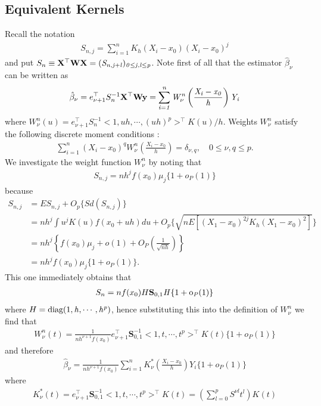 \documentclass[12pt]{article}
\renewcommand{\=}[1]{\stackrel{#1}{=}} %
\theoremstyle{definition}
\begin{document}
\subsection{Equivalent Kernels}
	Recall the notation
	\begin{align}
	S_{n,j}=\sum_{i=1}^nK_h(X_i-x_0)(X_i-x_0)^j
	\end{align}
	and put $S_n\equiv\bf X^{\top}WX=\it(S_{n,j+l})_{0\leq j,l\leq p}$. Note first of all that the estimator $\hat{\beta}_{\nu}$ can be written as
	\begin{align}
	\hat{\beta}_{\nu}=e_{\nu+1}^{\top}S_n^{-1}\bf X^{\top}Wy=\it\sum_{i=1}^nW_{\nu}^n\left(\frac{X_i-x_0}{h}\right)Y_i
	\end{align}
	where $W_{\nu}^n(u)=e_{\nu+1}^{\top}S_n^{-1}<1,uh,\cdots,(uh)^p>^{\top}K(u)/h$. Weights $W_{\nu}^n$ satisfy the following discrete moment conditions :
	\begin{align}
	\sum_{i=1}^n(X_i-x_0)^qW_{\nu}^n\left(\frac{X_i-x_0}{h}\right)=\delta_{\nu,q},\quad0\leq\nu,q\leq p.
	\end{align}
	We investigate the weight function $W_{\nu}^n$ by noting that
	\begin{align}
	S_{n,j}=nh^jf(x_0)\mu_j\{1+o_P(1)\}
	\end{align}
	because
	\begin{align}
	\nonumber S_{n,j}&=ES_{n,j}+O_p\{Sd(S_{n,j})\}\\
	\nonumber&=nh^j\int u^jK(u)f(x_0+uh)du+O_p\{\sqrt{nE[(X_1-x_0)^{2j}K_h(X_1-x_0)^2]}\}\\
	\nonumber&=nh^j\left\{f(x_0)\mu_j+o(1)+O_P\left(\frac{1}{\sqrt{nh}}\right)\right\}\\
	&=nh^jf(x_0)\mu_j\{1+o_P(1)\}.
	\end{align}
	This one immediately obtains that
	\begin{align}
	S_n=nf(x_0)H\bf S_{\rm0,1}\it H\{\rm1+o_{\it P}(\rm1)\}
	\end{align}
	where $H=\rm diag(1,\it h,\cdots,h^p)$, hence substituting this into the definition of $W_{\nu}^n$ we find that
	\begin{align}
	W_{\nu}^n(t)=\frac{1}{nh^{\nu+1}f(x_0)}e_{\nu+1}^{\top}\mathbf{S}_{0,1}^{-1}<1,t,\cdots,t^p>^{\top}K(t)\{1+o_P(1)\}
	\end{align}
	and therefore
	\begin{align}
	\hat{\beta}_{\nu}=\frac{1}{nh^{\nu+1}f(x_0)}\sum_{i=1}^nK^{*}_{\nu}\left(\frac{X_i-x_0}{h}\right)Y_i\{1+o_P(1)\}
	\end{align}
	where
	\begin{align}
	K^{*}_{\nu}(t)=e_{\nu+1}^{\top}\mathbf{S}_{0,1}^{-1}<1,t,\cdots,t^p>^{\top}K(t)=\left(\sum_{l=0}^pS^{\nu l}t^l\right)K(t)
	\end{align}
\end{document}
